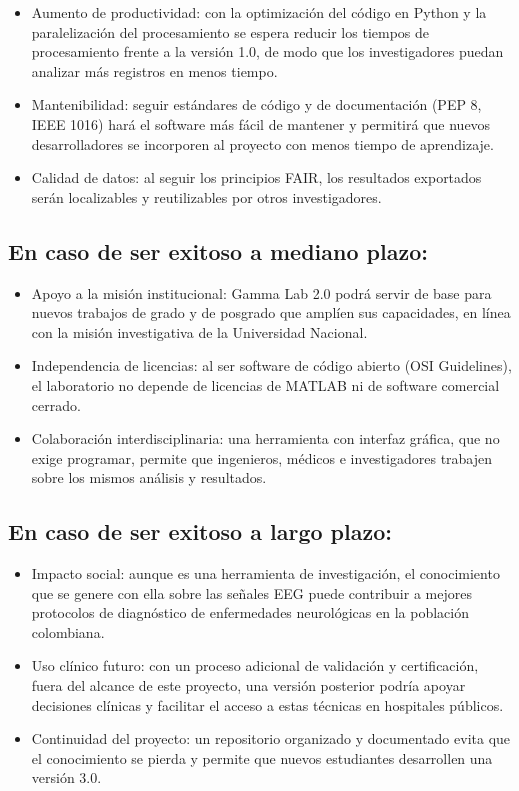\documentclass[12pt,letterpaper]{article}
\begin{document}
\begin{itemize}
  \item Aumento de productividad: con la optimización del código en Python y la paralelización del procesamiento se espera reducir los tiempos de procesamiento frente a la versión 1.0, de modo que los investigadores puedan analizar más registros en menos tiempo.
  \item Mantenibilidad: seguir estándares de código y de documentación (PEP 8, IEEE 1016) hará el software más fácil de mantener y permitirá que nuevos desarrolladores se incorporen al proyecto con menos tiempo de aprendizaje.
  \item Calidad de datos: al seguir los principios FAIR, los resultados exportados serán localizables y reutilizables por otros investigadores.
\end{itemize}

\subsection{En caso de ser exitoso a mediano plazo:} 
\begin{itemize}
  \item Apoyo a la misión institucional: Gamma Lab 2.0 podrá servir de base para nuevos trabajos de grado y de posgrado que amplíen sus capacidades, en línea con la misión investigativa de la Universidad Nacional.
  \item Independencia de licencias: al ser software de código abierto (OSI Guidelines), el laboratorio no depende de licencias de MATLAB ni de software comercial cerrado.
  \item Colaboración interdisciplinaria: una herramienta con interfaz gráfica, que no exige programar, permite que ingenieros, médicos e investigadores trabajen sobre los mismos análisis y resultados.
\end{itemize}

\subsection{En caso de ser exitoso a largo plazo:}
\begin{itemize}
  \item Impacto social: aunque es una herramienta de investigación, el conocimiento que se genere con ella sobre las señales EEG puede contribuir a mejores protocolos de diagnóstico de enfermedades neurológicas en la población colombiana.
  \item Uso clínico futuro: con un proceso adicional de validación y certificación, fuera del alcance de este proyecto, una versión posterior podría apoyar decisiones clínicas y facilitar el acceso a estas técnicas en hospitales públicos.
  \item Continuidad del proyecto: un repositorio organizado y documentado evita que el conocimiento se pierda y permite que nuevos estudiantes desarrollen una versión 3.0.
\end{itemize}
\end{document}
